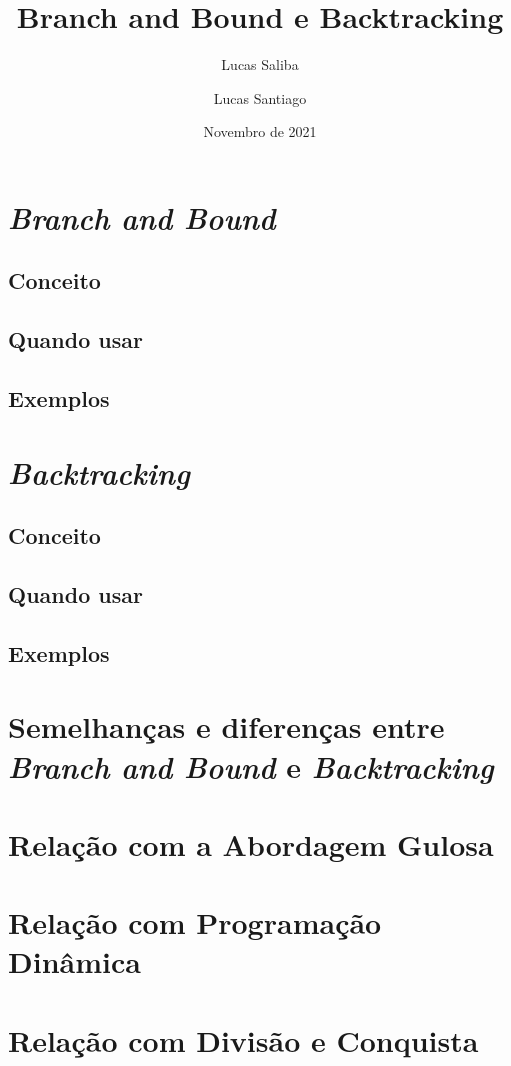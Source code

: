 \documentclass{article}
\title{Branch and Bound e Backtracking}
\author{Lucas Saliba \and Lucas Santiago}
\date{Novembro de 2021}
\begin{document}
\maketitle

\section{\emph{Branch and Bound}}

\subsection{Conceito}
\subsection{Quando usar}
\subsection{Exemplos}

\section{\emph{Backtracking}}

\subsection{Conceito}
\subsection{Quando usar}
\subsection{Exemplos}

\section{Semelhanças e diferenças entre \emph{Branch and Bound} e \emph{Backtracking}}

\section{Relação com a Abordagem Gulosa}
\section{Relação com Programação Dinâmica}
\section{Relação com Divisão e Conquista}
\end{document}
